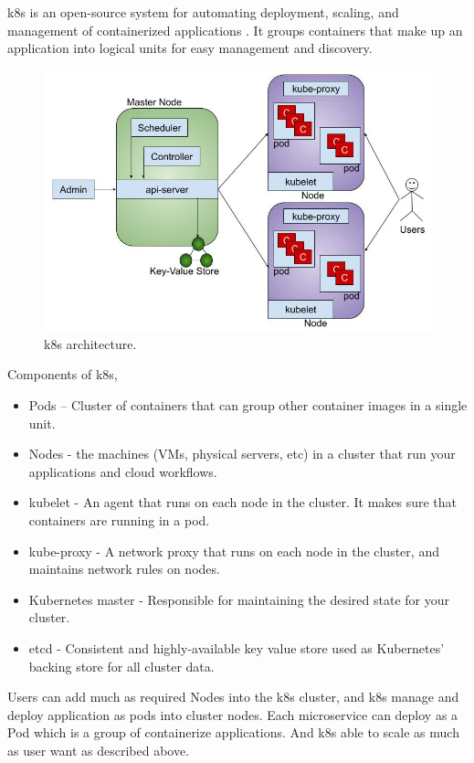 \acrfull{k8s} is an open-source system for automating deployment, scaling, and management of containerized applications \cite{LinuxFoundationProduction-GradeKubernetes}. It groups containers that make up an application into logical units for easy management and discovery.
\begin{figure}[htp]
    \centering
    \includegraphics[width=1\textwidth]{method/microservice/k8s_architecture_v3.jpg}
    \caption{\acrfull{k8s} architecture.}
    \label{fi:k8s_architecture}
\end{figure}
Components of \acrshort{k8s},
\begin{itemize}
    \item Pods – Cluster of containers that can group other container images in a single unit.
    \item Nodes - the machines (VMs, physical servers, etc) in a cluster that run your applications and cloud workflows.
    \item kubelet - An agent that runs on each node in the cluster. It makes sure that containers are running in a pod.
    \item kube-proxy - A network proxy that runs on each node in the cluster, and maintains network rules on nodes.
    \item Kubernetes master - Responsible for maintaining the desired state for your cluster.
    \item etcd - Consistent and highly-available key value store used as Kubernetes’ backing store for all cluster data.
\end{itemize}
Users can add much as required Nodes into the \acrshort{k8s} cluster, and \acrshort{k8s} manage and deploy application as pods into cluster nodes.
Each microservice can deploy as a Pod which is a group of containerize applications. And \acrshort{k8s} able to scale as much as user want as described above.

